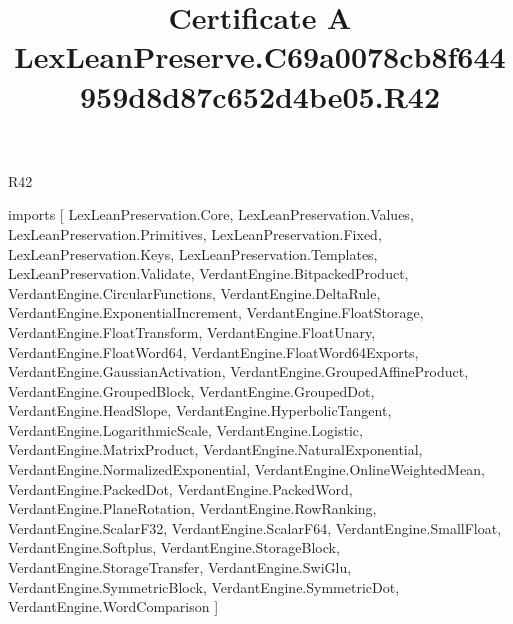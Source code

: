 \begin{lexlean}{R42}
\title{Certificate A LexLeanPreserve.C69a0078cb8f644959d8d87c652d4be05.R42}
\begin{coremodule}
imports [
  LexLeanPreservation.Core,
  LexLeanPreservation.Values,
  LexLeanPreservation.Primitives,
  LexLeanPreservation.Fixed,
  LexLeanPreservation.Keys,
  LexLeanPreservation.Templates,
  LexLeanPreservation.Validate,
  VerdantEngine.BitpackedProduct,
  VerdantEngine.CircularFunctions,
  VerdantEngine.DeltaRule,
  VerdantEngine.ExponentialIncrement,
  VerdantEngine.FloatStorage,
  VerdantEngine.FloatTransform,
  VerdantEngine.FloatUnary,
  VerdantEngine.FloatWord64,
  VerdantEngine.FloatWord64Exports,
  VerdantEngine.GaussianActivation,
  VerdantEngine.GroupedAffineProduct,
  VerdantEngine.GroupedBlock,
  VerdantEngine.GroupedDot,
  VerdantEngine.HeadSlope,
  VerdantEngine.HyperbolicTangent,
  VerdantEngine.LogarithmicScale,
  VerdantEngine.Logistic,
  VerdantEngine.MatrixProduct,
  VerdantEngine.NaturalExponential,
  VerdantEngine.NormalizedExponential,
  VerdantEngine.OnlineWeightedMean,
  VerdantEngine.PackedDot,
  VerdantEngine.PackedWord,
  VerdantEngine.PlaneRotation,
  VerdantEngine.RowRanking,
  VerdantEngine.ScalarF32,
  VerdantEngine.ScalarF64,
  VerdantEngine.SmallFloat,
  VerdantEngine.Softplus,
  VerdantEngine.StorageBlock,
  VerdantEngine.StorageTransfer,
  VerdantEngine.SwiGlu,
  VerdantEngine.SymmetricBlock,
  VerdantEngine.SymmetricDot,
  VerdantEngine.WordComparison
]


\end{coremodule}
\end{lexlean}
